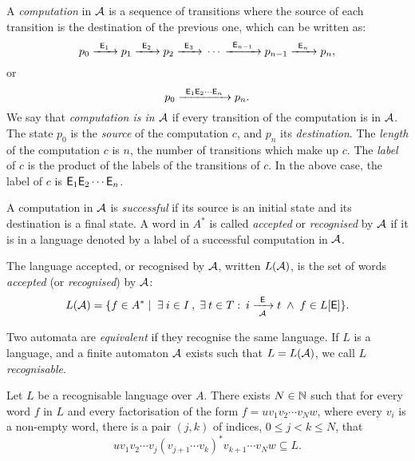 A \emph{computation} in ${\mathcal{A}}$ is a sequence of transitions where the source of each transition is the destination of the previous one, which can be written as:
\[
    p_0 {\; \xrightarrow[]{\: \; {\mathsf{E}}_1 \: \;} \;} p_1 {\; \xrightarrow[]{\: \; {\mathsf{E}}_2 \: \;} \;} p_2 {\; \xrightarrow[]{\: \; {\mathsf{E}}_3 \: \;} \;} \dotsm {\; \xrightarrow[]{\: \; {\mathsf{E}}_{n-1} \: \;} \;} p_{n-1} {\; \xrightarrow[]{\: \; {\mathsf{E}}_n \: \;} \;} p_n,
\]
or
\[
    p_0 {\; \xrightarrow[]{\: \; {\mathsf{E}}_1 {\mathsf{E}}_2 \dotsm {\mathsf{E}}_n \: \;} \;} p_n.
\]
We say that \emph{computation is in ${\mathcal{A}}$} if every transition of the computation is in ${\mathcal{A}}$. The state $p_0$ is the \emph{source} of the computation $c$, and $p_n$ its \emph{destination}. The \emph{length} of the computation $c$ is $n$, the number of transitions which make up $c$. The \emph{label} of $c$ is the product of the labels of the transitions of $c$. In the above case, the label of $c$ is ${\mathsf{E}}_1 {\mathsf{E}}_2 \dotsm {\mathsf{E}}_n$.

A computation in ${\mathcal{A}}$ is \emph{successful} if its source is an initial state and its destination is a final state. A word in $A^*$ is called \emph{accepted} or \emph{recognised} by ${\mathcal{A}}$ if it is in a language denoted by a label of a successful computation in ${\mathcal{A}}$.

\begin{defn}
    The language accepted, or recognised by ${\mathcal{A}}$, written $L({\mathcal{A}})$, is the set of words \emph{accepted} (or \emph{recognised}) by ${\mathcal{A}}$:
    \[
        L({\mathcal{A}}) = \{ f \in A^* \mid \; \exists \: i \in I \: , \; \exists \: t \in T : \: i {\; \xrightarrow[{\mathcal{A}}]{\: \; {\mathsf{E}} \: \;} \;} t \; \wedge \; f \in L[{\mathsf{E}}] \}.
    \]
\end{defn}

Two automata are \emph{equivalent} if they recognise the same language. If $L$ is a language, and a finite automaton ${\mathcal{A}}$ exists such that $L = L({\mathcal{A}})$, we call $L$ \emph{recognisable}.

\begin{lemma}\label{lm:block_star_lemma}
    Let $L$ be a recognisable language over $A$. There exists $N \in \mathbb{N}$ such that for every word $f$ in $L$ and every factorisation of the form $f = u v_1 v_2 \dotsm v_N w$, where every $v_i$ is a non-empty word, there is a pair $(j,k)$ of indices, $0 \leq j < k \leq N$, that
    \[
        u v_1 v_2 \dotsm v_j {(v_{j+1} \dotsm v_k)}^* v_{k+1} \dotsm v_N w \subseteq L.
    \]
\end{lemma}

